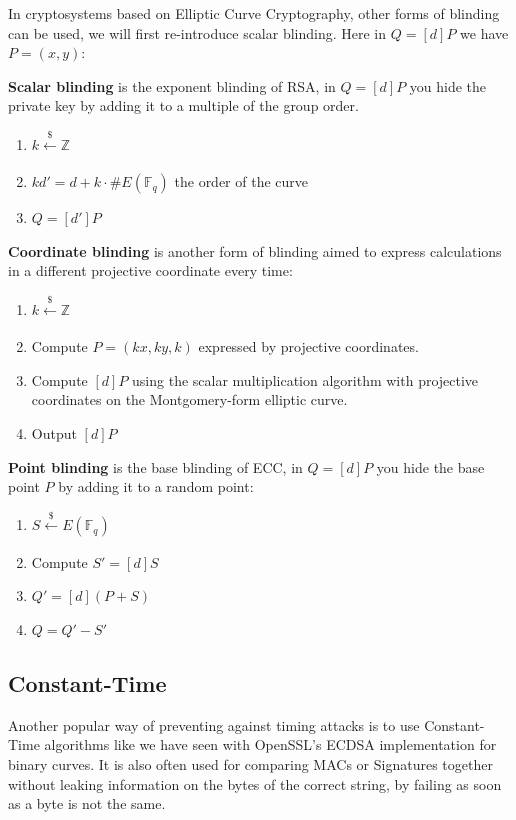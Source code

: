 \documentclass[a4paper,11pt]{article}
\begin{document}
In cryptosystems based on Elliptic Curve Cryptography, other forms of blinding can be used, we will first re-introduce scalar blinding. Here in $Q = [d]P$ we have $P=(x,y)$:

\textbf{Scalar blinding} is the exponent blinding of RSA, in $Q = [d]P$ you hide the private key by adding it to a multiple of the group order.

\begin{enumerate}
\item{$k \xleftarrow[]{\$} \mathbb{Z}$}
\item{$k d' = d + k \cdot \#E(\mathbb{F}_q)$ the order of the curve}
\item{$Q = [d']P$}
\end{enumerate}

\textbf{Coordinate blinding} is another form of blinding aimed to express calculations in a different projective coordinate every time:

\begin{enumerate}
\item{$k \xleftarrow[]{\$} \mathbb{Z}$}
\item{Compute $P = (kx, ky, k)$ expressed by projective coordinates.}
\item{Compute $[d]P$ using the scalar multiplication algorithm with projective coordinates on the Montgomery-form elliptic curve.}
\item{Output $[d]P$}
\end{enumerate}

\textbf{Point blinding} is the base blinding of ECC, in $Q = [d]P$ you hide the base point $P$ by adding it to a random point:

\begin{enumerate}
\item{$S \xleftarrow[]{\$} E(\mathbb{F}_q)$}
\item{Compute $S' = [d]S$}
\item{$Q' = [d](P + S)$}
\item{$Q = Q' - S'$}
\end{enumerate}

\subsection{Constant-Time}

Another popular way of preventing against timing attacks is to use Constant-Time algorithms like we have seen with OpenSSL's ECDSA implementation for binary curves. It is also often used for comparing MACs or Signatures together without leaking information on the bytes of the correct string, by failing as soon as a byte is not the same.\\
\end{document}
